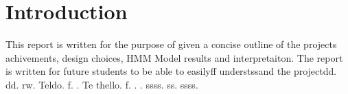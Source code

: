 
\section{Introduction}
This report is written for the purpose of given a concise outline of the projects achivements, 
design choices, HMM Model results and interpretaiton. The report is written for future students 
to be able to easilyff understssand the projectdd. dd. rw. Teldo. f. . 
Te thello. f. . . ssss. ss. ssss. 
  
